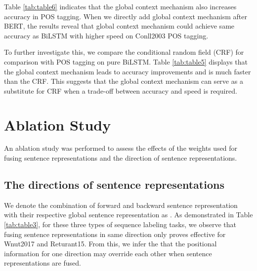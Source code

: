 \documentclass[lettersize,journal]{IEEEtran}
\begin{document}
Table \ref{tab:table6} indicates that the global context mechanism also increases accuracy in POS tagging. When we directly add global context mechanism after BERT, the results reveal that global context mechanism could achieve same accuracy as BiLSTM with higher speed on Conll2003 POS tagging. 

To further investigate this, we compare the conditional random field (CRF) for comparison with POS tagging on pure BiLSTM. Table \ref{tab:table5} displays that the global context mechanism leads to accuracy improvements and is much faster than the CRF. This suggests that the global context mechanism can serve as a substitute for CRF when a trade-off between accuracy and speed is required.

 \begin{table*}[]
\centering
{}
\caption{Experiments on adding global context mechanism directly. \label{tab:table7}}
\end{table*}



\section{Ablation Study}
An ablation study was performed to assess the effects of the weights used for fusing sentence representations and the direction of sentence representations.
\subsection{The directions of sentence representations}

We denote the combination of forward and backward sentence representation with their respective global sentence representation as . As demonstrated in Table \ref{tab:table3}, for these three types of sequence labeling tasks, we observe that fusing sentence representations in same direction only proves effective for Wnut2017 and Returant15. From this, we infer the that the positional information for one direction may override each other when sentence representations are fused.
\end{document}
